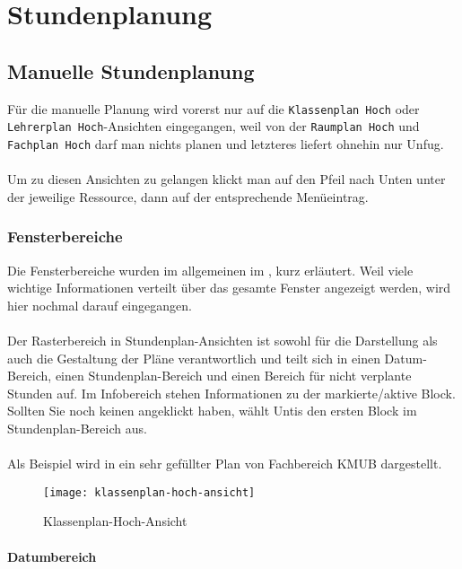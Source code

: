 
\chapter{Stundenplanung}
\label{chap:schedules}

\section{Manuelle Stundenplanung}

Für die manuelle Planung wird vorerst nur auf die \texttt{Klassenplan Hoch} oder \texttt{Lehrerplan Hoch}-Ansichten eingegangen, weil von der \texttt{Raumplan Hoch} und \texttt{Fachplan Hoch} darf man nichts planen und letzteres liefert ohnehin nur Unfug.\\
\\
Um zu diesen Ansichten zu gelangen klickt man auf den Pfeil nach Unten unter der jeweilige Ressource, dann auf der entsprechende Menüeintrag.

\subsection{Fensterbereiche}

Die Fensterbereiche wurden im allgemeinen im , kurz erläutert. Weil viele wichtige Informationen verteilt über das gesamte Fenster angezeigt werden, wird hier nochmal darauf eingegangen.\\
\\
Der Rasterbereich in Stundenplan-Ansichten ist sowohl für die Darstellung als auch die Gestaltung der Pläne verantwortlich und teilt sich in einen Datum-Bereich, einen Stundenplan-Bereich und einen Bereich für nicht verplante Stunden auf. Im Infobereich stehen Informationen zu der markierte/aktive Block. Sollten Sie noch keinen angeklickt haben, wählt Untis den ersten Block im Stundenplan-Bereich aus.\\
\\
Als Beispiel wird in  ein sehr gefüllter Plan von Fachbereich KMUB dargestellt.

\newpage

\begin{figure}[h]
	\centering
	\texttt{[image: klassenplan-hoch-ansicht]}
	\vspace{-5pt}
	\caption{Klassenplan-Hoch-Ansicht}
	\label{fig:klassenplan-hoch-ansicht}
\end{figure}

\subsubsection{Datumbereich}


